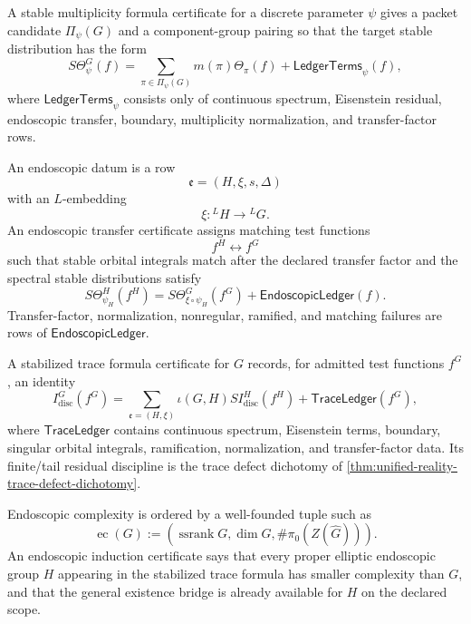 \begin{definition}
\label{def:unified-reality-general-g-stable-multiplicity-formula}
A stable multiplicity formula certificate for a discrete parameter
$\psi$ gives a packet candidate $\Pi_\psi(G)$ and a component-group
pairing so that the target stable distribution has the form
$$
S\Theta_\psi^G(f)
=
\sum_{\pi\in\Pi_\psi(G)}m(\pi)\Theta_\pi(f)
+
\mathsf{LedgerTerms}_\psi(f),
$$
where $\mathsf{LedgerTerms}_\psi$ consists only of continuous spectrum,
Eisenstein residual, endoscopic transfer, boundary, multiplicity
normalization, and transfer-factor rows.
\end{definition}

\begin{definition}
\label{def:unified-reality-general-g-endoscopic-transfer-cert}
An endoscopic datum is a row
$$
\mathfrak e=(H,\xi,s,\Delta)
$$
with an $L$-embedding
$$
\xi:{}^LH\to{}^LG.
$$
An endoscopic transfer certificate assigns matching test functions
$$
f^H\longleftrightarrow f^G
$$
such that stable orbital integrals match after the declared transfer
factor and the spectral stable distributions satisfy
$$
S\Theta_{\psi_H}^H(f^H)
=
S\Theta_{\xi\circ\psi_H}^G(f^G)
+
\mathsf{EndoscopicLedger}(f).
$$
Transfer-factor, normalization, nonregular, ramified, and matching
failures are rows of $\mathsf{EndoscopicLedger}$.
\end{definition}

\begin{definition}
\label{def:unified-reality-general-g-stabilized-trace-formula-cert}
A stabilized trace formula certificate for $G$ records, for admitted
test functions $f^G$, an identity
$$
I_{\mathrm{disc}}^G(f^G)
=
\sum_{\mathfrak e=(H,\xi)}
\iota(G,H)SI_{\mathrm{disc}}^H(f^H)
+
\mathsf{TraceLedger}(f^G),
$$
where $\mathsf{TraceLedger}$ contains continuous spectrum, Eisenstein
terms, boundary, singular orbital integrals, ramification,
normalization, and transfer-factor data. Its finite/tail residual
discipline is the trace defect dichotomy of
\autoref{thm:unified-reality-trace-defect-dichotomy}.
\end{definition}

\begin{definition}
\label{def:unified-reality-general-g-endoscopic-induction-cert}
Endoscopic complexity is ordered by a well-founded tuple such as
$$
\operatorname{ec}(G)
:=
(\operatorname{ssrank}G,\dim G,\#\pi_0(Z(\widehat G))).
$$
An endoscopic induction certificate says that every proper elliptic
endoscopic group $H$ appearing in the stabilized trace formula has
smaller complexity than $G$, and that the general existence bridge is
already available for $H$ on the declared scope.
\end{definition}


